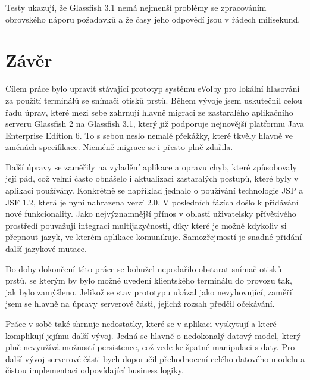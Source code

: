 \documentclass[11pt,twoside,a4paper]{book}
\begin{document}
\newpage

Testy ukazují, že Glassfish 3.1 nemá nejmenší problémy se zpracováním obrovského náporu požadavků a že časy jeho odpovědí jsou v řádech milisekund.

\chapter{Závěr}

Cílem práce bylo upravit stávající prototyp systému eVolby\cite{www:prototyp} pro lokální hlasování za použití terminálů se snímači otisků prstů. Během vývoje jsem uskutečnil celou řadu úprav, které mezi sebe zahrnují hlavně migraci ze zastaralého aplikačního serveru Glassfish 2 na Glassfish 3.1, který již podporuje nejnovější platformu Java Enterprise Edition 6. To s sebou neslo nemalé překážky, které tkvěly hlavně ve změnách specifikace. Nicméně migrace se i přesto plně zdařila.

Další úpravy se zaměřily na vyladění aplikace a opravu chyb, které způsobovaly její pád, což velmi často obnášelo i aktualizaci zastaralých postupů, které byly v aplikaci používány. Konkrétně se například jednalo o používání technologie JSP a JSF 1.2, která je nyní nahrazena verzí 2.0. V posledních fázích došlo k přidávání nové funkcionality. Jako nejvýznamnější přínos v oblasti uživatelsky přívětivého prostředí pouvažuji integraci multijazyčnosti, díky které je možné kdykoliv si přepnout jazyk, ve kterém aplikace komunikuje. Samozřejmostí je snadné přidání další jazykové mutace.

Do doby dokončení této práce se bohužel nepodařilo obstarat snímač otisků prstů, se kterým by bylo možné uvedení klientského terminálu do provozu tak, jak bylo zamýšleno. Jelikož se stav prototypu ukázal jako nevyhovující, zaměřil jsem se hlavně na úpravy serverové části, jejichž rozsah předčil očekávání. 

Práce v sobě také shrnuje nedostatky, které se v aplikaci vyskytují a které komplikují jejímu další vývoj. Jedná se hlavně o nedokonalý datový model, který plně nevyužívá možností persistence, což vede ke špatné manipulaci s daty. Pro další vývoj serverové části bych doporučil přehodnocení celého datového modelu a čistou implementaci odpovídající business logiky.




\end{document}
